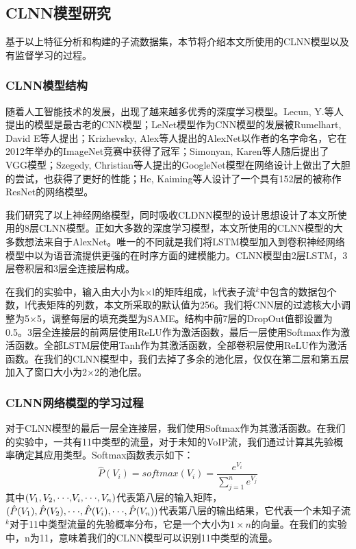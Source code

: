 \subsection{CLNN模型研究}
基于以上特征分析和构建的子流数据集，本节将介绍本文所使用的CLNN模型以及有监督学习的过程。
\subsubsection{CLNN模型结构}
随着人工智能技术的发展，出现了越来越多优秀的深度学习模型。Lecun, Y.等人\supercite{6}提出的模型是最古老的CNN模型；LeNet模型作为CNN模型的发展被Rumelhart, David E\supercite{7}等人提出；Krizhevsky, Alex\supercite{8}等人提出的AlexNet以作者的名字命名，它在2012年举办的ImageNet竞赛中获得了冠军；Simonyan, Karen\supercite{9}等人随后提出了VGG模型；Szegedy, Christian\supercite{10}等人提出的GoogleNet模型在网络设计上做出了大胆的尝试，也获得了更好的性能；He, Kaiming\supercite{11}等人设计了一个具有152层的被称作ResNet的网络模型。

我们研究了以上神经网络模型，同时吸收CLDNN模型\supercite{clnn}的设计思想设计了本文所使用的8层CLNN模型。正如大多数的深度学习模型，本文所使用的CLNN模型的大多数想法来自于AlexNet。唯一的不同就是我们将LSTM模型加入到卷积神经网络模型中以为语音流提供更强的在时序方面的建模能力。CLNN模型由2层LSTM，3层卷积层和3层全连接层构成。

在我们的实验中，输入由大小为k$\times$l的矩阵组成，k代表子流$^k$中包含的数据包个数，l代表矩阵的列数，本文所采取的默认值为256。我们将CNN层的过滤核大小调整为5$\times$5，调整每层的填充类型为SAME。结构中前7层的DropOut值都设置为0.5。3层全连接层的前两层使用ReLU作为激活函数，最后一层使用Softmax作为激活函数。全部LSTM层使用Tanh作为其激活函数，全部卷积层使用ReLU作为激活函数。在我们的CLNN模型中，我们去掉了多余的池化层，仅仅在第二层和第五层加入了窗口大小为2$\times$2的池化层。

\subsubsection{CLNN网络模型的学习过程}
对于CLNN模型的最后一层全连接层，我们使用Softmax作为其激活函数。在我们的实验中，一共有11中类型的流量，对于未知的VoIP流，我们通过计算其先验概率确定其应用类型。Softmax函数表示如下：
\begin{equation}
\hat P({V_i}) = softmax({V_i}) = \frac{{{e^{{V_i}}}}}{{\sum\limits_{j = 1}^n {{e^{{V_j}}}} }}
\end{equation}
其中$({V_1},{V_2},{\rm{\cdot\cdot\cdot,}}{V_i},{\rm{\cdot\cdot\cdot}},{V_n})$代表第八层的输入矩阵，$(\hat P({V_1}),\hat P({V_2}),{\rm{\cdot\cdot\cdot}},\hat P({V_i}),{\rm{\cdot\cdot\cdot}},\hat P({V_n}))$代表第八层的输出结果，它代表一个未知子流$^k$对于11中类型流量的先验概率分布，它是一个大小为$1 \times n$的向量。在我们的实验中，n为11，意味着我们的CLNN模型可以识别11中类型的流量。

